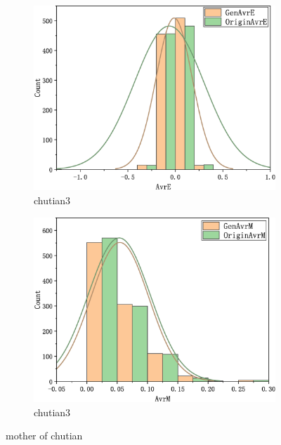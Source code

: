 \documentclass[%
reprint,
amsmath,amssymb,
aps,
]{revtex4-2}
\begin{document}
\begin{figure}[htbp]
\begin{subfigure}{0.4\linewidth}
	\end{subfigure}
	\centering
	\begin{subfigure}{0.4\linewidth}
		\centering
		\includegraphics[scale=0.1]{16mix32_16_T_3_E}
		\caption{chutian3}
		\label{chutian3}%
	\end{subfigure}
	\begin{subfigure}{0.4\linewidth}
		\centering
		\includegraphics[scale=0.1]{16mix32_16_M}
		\caption{chutian3}
		\label{chutian3}%
	\end{subfigure}

	\caption{mother of chutian}
	\label{da_chutian}
	\end{figure}
\end{document}

